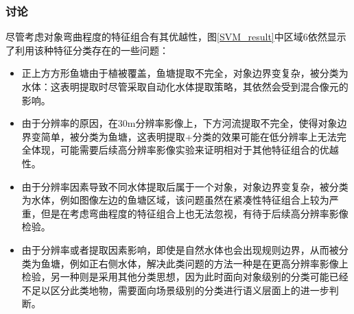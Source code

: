 \documentclass[supercite]{upcthesis}
\begin{document}
\subsubsection{讨论}
尽管考虑对象弯曲程度的特征组合有其优越性，图\ref{SVM_result}中区域6依然显示了利用该种特征分类存在的一些问题：
\begin{itemize}
\item 正上方方形鱼塘由于植被覆盖，鱼塘提取不完全，对象边界变复杂，被分类为水体：这表明提取时尽管采取自动化水体提取策略，其依然会受到混合像元的影响。
\item 由于分辨率的原因，在30m分辨率影像上，下方河流提取不完全，使得对象边界变简单，被分类为鱼塘，这表明提取+分类的效果可能在低分辨率上无法完全体现，可能需要后续高分辨率影像实验来证明相对于其他特征组合的优越性。
\item 由于分辨率因素导致不同水体提取后属于一个对象，对象边界变复杂，被分类为水体，例如图像左边的鱼塘区域，该问题虽然在紧凑性特征组合上较为严重，但是在考虑弯曲程度的特征组合上也无法忽视，有待于后续高分辨率影像检验。
\item 由于分辨率或者提取因素影响，即使是自然水体也会出现规则边界，从而被分类为鱼塘，例如正右侧水体，解决此类问题的方法一种是在更高分辨率影像上检验，另一种则是采用其他分类思想，因为此时面向对象级别的分类可能已经不足以区分此类地物，需要面向场景级别的分类进行语义层面上的进一步判断。
\end{itemize}
\end{document}
